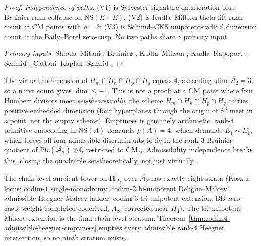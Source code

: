 \begin{proof}
\emph{Independence of paths.} (V1) is Sylvester signature
enumeration plus Bruinier rank collapse on $\mathrm{NS}(E\times E)$;
(V2) is Kudla--Millson theta-lift rank count at CM points with
$\rho=3$; (V3) is Schmid--CKS unipotent-radical dimension count at
the Baily--Borel zero-cusp. No two paths share a primary input.

\emph{Primary inputs.} Shioda--Mitani
\cite[\S 1, Cor.~2]{ShiodaMitani1974}; Bruinier
\cite[Thm.~3.22, (3.36)]{Bruinier2002}; Kudla--Millson
\cite[Thm.~1.2]{KudlaMillson1990}; Kudla--Rapoport
\cite[\S 3]{KudlaRapoport2000}; Schmid
\cite[\S 5, Thm.~5.13]{Schmid1973}; Cattani--Kaplan--Schmid
\cite[Cor.~3.13]{CattaniKaplanSchmid1986}.
\end{proof}

\begin{remark}
\label{rem:codim4-dimensional-vs-arithmetic}
%
The virtual codimension of $H_m\cap H_n\cap H_p\cap H_q$ equals
$4$, exceeding $\dim\overline{\mathcal A_2}=3$, so a na\"ive count
gives $\dim\leq -1$. This is not a proof: at a CM point where four
Humbert divisors meet \emph{set-theoretically}, the scheme
$H_m\cap H_n\cap H_p\cap H_q$ carries positive embedded dimension
(four hyperplanes through the origin of $\mathbb A^3$ meet in a
point, not the empty scheme). Emptiness is genuinely arithmetic:
rank-$4$ primitive embedding in $\mathrm{NS}(A)$ demands
$\rho(A)=4$, which demands $E_1\sim E_2$, which forces all four
admissible discriminants to lie in the rank-$3$ Bruinier quotient
of $\mathrm{Pic}(\overline{\mathcal A_2})\otimes\mathbb Q$
restricted to $\mathrm{CM}_D$. Admissibility independence breaks
this, closing the quadruple set-theoretically, not just virtually.
\end{remark}


%
\begin{corollary}
\label{cor:octachotomy-chain-level-ambient-tower}
The chain-level ambient tower on $\mathbf{H}_{\Delta_5}$ over
$\overline{\mathcal A_2}$ has exactly eight strata (Koszul locus;
codim-$1$ single-monodromy; codim-$2$ bi-unipotent Deligne--Malcev;
admissible-Heegner Malcev ladder; codim-$3$ tri-unipotent extension;
BB zero-cusp; weight-completed coderived; $A_\infty$-corrected near
$H_3$). The tri-unipotent Malcev extension is the final chain-level
stratum: Theorem~\textup{\ref{thm:codim4-admissible-heegner-emptiness}}
empties every admissible rank-$4$ Heegner intersection, so no ninth
stratum exists.
\end{corollary}

